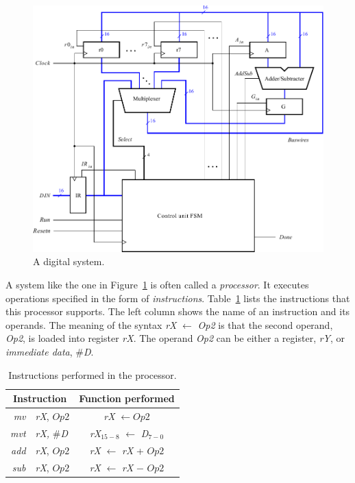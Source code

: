 \documentclass[epsfig,10pt,fullpage]{article} \addtolength{\textwidth}{1.5in}
\begin{document}
\begin{figure}[H]
	\begin{center}
		\includegraphics[scale = 0.8]{figures/figure1.pdf}
	\end{center}
	\caption{A digital system.}
	\label{fig:fig1}
\end{figure}

\newpage
\noindent
A system like the one in Figure~\ref{fig:fig1} is often called a {\it processor}. It 
executes operations specified in the 
form of {\it instructions}. Table~\ref{tab:instructions} lists the instructions that this 
processor supports. The left column shows the name of an instruction and its operands. 
The meaning of the syntax {\it rX} $\leftarrow$ {\it Op2} is that the second operand,
{\it Op2}, is loaded into register {\it rX}. The operand {\it Op2} can be either a
register, {\it rY}, or {\it immediate data}, \#{\it D}.

\begin{table}[H]
\begin{center}
\begin{tabular}{rl|c}
   \multicolumn{2}{c|}{Instruction} & Function performed \\ \hline 
   \rule[0.01in]{0in}{0.15in}{\it mv} & {\it rX}, $Op2$ & {\it rX} $\leftarrow Op2$ \\ 
		  \rule[-0.075in]{0in}{0.2in}{\it mvt} & {\it rX,} \#{\it D} & {\it rX$_{15-8}$}
          $\leftarrow$ {\it D$_{7-0}$}\\ 
   \rule[-0.075in]{0in}{0.2in}{\it add} & {\it rX}, $Op2$ & {\it rX} $\leftarrow$ {\it rX} + $Op2$ \\ 
   \rule[-0.075in]{0in}{0.2in}{\it sub} & {\it rX}, $Op2$ & {\it rX} $\leftarrow$ {\it rX} $-$ $Op2$ \\ 
\end{tabular}
\caption{Instructions performed in the processor.}
\label{tab:instructions}
\end{center}
\end{table}
\end{document}
